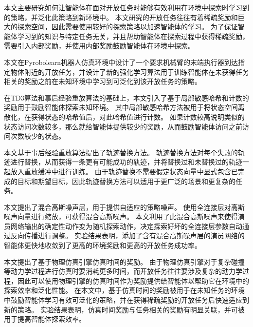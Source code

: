 \begin{cabstract}
本文主要研究如何让智能体在面对开放任务时能够有效利用在环境中探索时学习到的策略，并泛化此策略到新环境中。
本文研究的开放任务往往有着稀疏奖励和巨大的探索空间，因此需要使用较好的探索策略以加速智能体的学习。
    为了保证智能体学习到的知识与特定任务无关，并且帮助智能体在探索过程中获得稀疏奖励，需要引入内部奖励，并使用内部奖励鼓励智能体在环境中探索。

本文在Pyrobolearn机器人仿真环境中设计了一个要求机械臂的末端执行器到达指定物体附近的开放任务，并设计了新的强化学习算法用于训练智能体在未获得任务相关的奖励之前在未知环境中学习到可泛化到该开放任务的策略。

在TD3算法和事后经验重放算法的基础上，本文引入了基于局部敏感哈希和计数的奖励用于鼓励智能体探索未知环境。
其中局部敏感哈希方法被用于将状态空间离散化，在获得状态的哈希值后，对此哈希值进行计数。
如果计数较高说明类似的状态访问次数较多，那么就给智能体提供较少的奖励，从而鼓励智能体访问之前访问次数较少的状态。

本文基于事后经验重放算法提出了轨迹替换方法。
轨迹替换方法对每个失败的轨迹进行替换，从而获得一条更有可能成功的轨迹，并将替换过和未替换过的轨迹一起放入重放缓冲中进行训练。
由于轨迹替换不需要假定状态向量中显式包含已完成的目标和期望目标，因此轨迹替换方法可以适用于更广泛的场景和更复杂的任务。


本文提出了混合高斯噪声层，用于提供自适应的策略噪声。
使用全连接层对高斯噪声向量进行缩放，可获得混合高斯噪声。
本文利用了此混合高斯噪声来使得演员网络输出的确定性动作变为随机探索动作，决定探索好坏的全连接层参数自动通过反向传播进行调整。
实验结果表明，添加了含有混合高斯噪声层的演员网络的智能体更快地收敛到了更高的环境奖励和更高的开放任务成功率。

本文提出了基于物理仿真引擎仿真时间的奖励。
    由于物理仿真引擎对于复杂碰撞等动力学过程进行仿真时要消耗更多时间，而开放任务往往要涉及复杂的动力学过程，因此可以使用物理引擎的仿真时间作为奖励提供给智能体以帮助它在环境中的探索效率和泛化性能。
    在本文中，基于仿真时间的奖励被用于在未知任务的环境中鼓励智能体学习有效可泛化的策略，并在获得稀疏奖励的开放任务后快速适应到新的策略。
    实验结果表明，仿真时间奖励与任务相关的奖励有明显关联，并可被用于提高智能体探索效率。

\end{cabstract}

